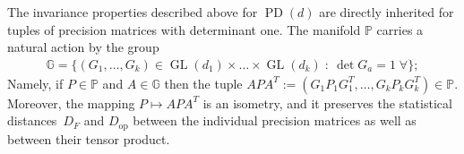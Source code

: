 \documentclass[aos]{imsart}
\theoremstyle{definition}
\numberwithin{equation}{section}
\DeclareMathOperator{\op}{op}
\DeclareMathOperator{\GL}{GL}
\DeclareMathOperator{\PD}{PD}
\newcommand{\R}{{\mathbb{R}}}
\renewcommand{\P}{{\mathbb{P}}}
\newcommand{\G}{{\mathbb{G}}}
\newcommand{\ot}{\otimes}
\newcommand{\samp}{x}
\newcommand{\rv}{X}
\newcommand{\CF}[1]{{\color{purple}[CF: #1]}}
\newcommand{\MW}[1]{{\color{red}[MW: #1]}}
\begin{document}
The invariance properties described above for $\PD(d)$ are directly inherited for tuples of precision matrices with determinant one.
The manifold $\P$ carries a natural action by the group
\begin{align*}
  \G = \{ (G_1,\dots,G_k) \in \GL(d_1) \times \dots \times \GL(d_k) \;:\: \det G_a = 1 \; \forall \};
\end{align*}
Namely, if $P \in \P$ and $A \in \G$ then the tuple $A P A^T := (G_1 P_1 G_1^T, \dots, G_k P_k G_k^T) \in \P$.
Moreover, the mapping $P \mapsto AP A^T$ is an isometry, and it preserves the statistical distances~$D_F$ and $D_{\op}$ between the individual precision matrices as well as between their tensor product.


\end{document}
